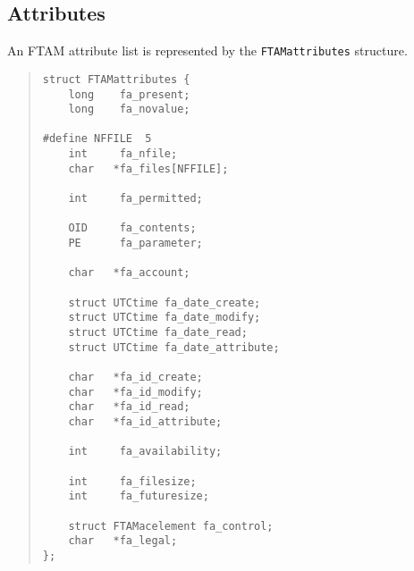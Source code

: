 \subsection	{Attributes}
An FTAM attribute list is represented by the \verb"FTAMattributes" structure.
\begin{quote}\small\begin{verbatim}
struct FTAMattributes {
    long    fa_present;
    long    fa_novalue;

#define NFFILE  5
    int     fa_nfile;
    char   *fa_files[NFFILE];
    
    int     fa_permitted;

    OID     fa_contents;
    PE      fa_parameter;

    char   *fa_account;

    struct UTCtime fa_date_create;
    struct UTCtime fa_date_modify;
    struct UTCtime fa_date_read;
    struct UTCtime fa_date_attribute;

    char   *fa_id_create;
    char   *fa_id_modify;
    char   *fa_id_read;
    char   *fa_id_attribute;

    int     fa_availability;

    int     fa_filesize;
    int     fa_futuresize;

    struct FTAMacelement fa_control;
    char   *fa_legal;
};
\end{verbatim}\end{quote}

\newpage	%

